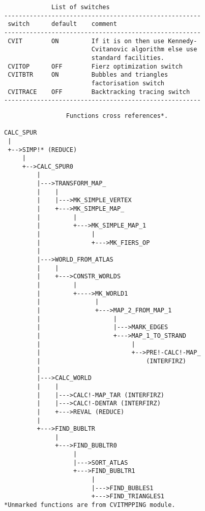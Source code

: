 \begin{verbatim}
             List of switches
------------------------------------------------------
 switch      default    comment
------------------------------------------------------
 CVIT        ON         If it is on then use Kennedy-
                        Cvitanovic algorithm else use
                        standard facilities.
 CVITOP      OFF        Fierz optimization switch
 CVITBTR     ON         Bubbles and triangles
                        factorisation switch
 CVITRACE    OFF        Backtracking tracing switch
------------------------------------------------------
\end{verbatim}


\begin{verbatim}
                 Functions cross references*.

CALC_SPUR
 |
 +-->SIMP!* (REDUCE)
     |
     +-->CALC_SPUR0
         |
         |--->TRANSFORM_MAP_
         |    |
         |    |--->MK_SIMPLE_VERTEX
         |    +--->MK_SIMPLE_MAP_
         |         |
         |         +--->MK_SIMPLE_MAP_1
         |              |
         |              +--->MK_FIERS_OP
         |
         |--->WORLD_FROM_ATLAS
         |    |
         |    +--->CONSTR_WORLDS
         |         |
         |         +---->MK_WORLD1
         |               |
         |               +--->MAP_2_FROM_MAP_1
         |                    |
         |                    |--->MARK_EDGES
         |                    +--->MAP_1_TO_STRAND
         |                         |
         |                         +-->PRE!-CALC!-MAP_
         |                             (INTERFIRZ)
         |
         |--->CALC_WORLD
         |    |
         |    |--->CALC!-MAP_TAR (INTERFIRZ)
         |    |--->CALC!-DENTAR (INTERFIRZ)
         |    +--->REVAL (REDUCE)
         |
         +--->FIND_BUBLTR
              |
              +--->FIND_BUBLTR0
                   |
                   |--->SORT_ATLAS
                   +--->FIND_BUBLTR1
                        |
                        |--->FIND_BUBLES1
                        +--->FIND_TRIANGLES1
*Unmarked functions are from CVITMPPING module.

\end{verbatim}
